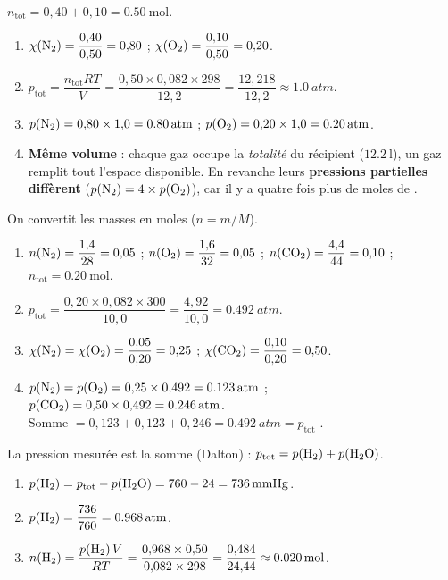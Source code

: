 \documentclass[11pt,a4paper]{article}
\begin{document}
\begin{corrige}
$n_{\text{tot}}=0{,}40+0{,}10=\qty{0.50}{\mole}$.
\begin{enumerate}[label=\alph*)]
  \item $\chi(\ce{N2})=\dfrac{0{,}40}{0{,}50}=0{,}80$ ; $\chi(\ce{O2})=\dfrac{0{,}10}{0{,}50}=0{,}20$.
  \item $p_{\text{tot}}=\dfrac{n_{\text{tot}}RT}{V}=\dfrac{0{,}50\times0{,}082\times298}{12{,}2}
        =\dfrac{12{,}218}{12{,}2}\approx\qty{1.0}{atm}$.
  \item $p(\ce{N2})=0{,}80\times1{,}0=\qty{0.80}{atm}$ ; $p(\ce{O2})=0{,}20\times1{,}0=\qty{0.20}{atm}$.
  \item \textbf{Même volume} : chaque gaz occupe la \emph{totalité} du récipient
        ($\qty{12.2}{\litre}$), un gaz remplit tout l'espace disponible. En revanche leurs
        \textbf{pressions partielles diffèrent} ($p(\ce{N2})=4\times p(\ce{O2})$), car il y a quatre
        fois plus de moles de .
\end{enumerate}
\end{corrige}

\begin{corrige}
On convertit les masses en moles ($n=m/M$).
\begin{enumerate}[label=\alph*)]
  \item $n(\ce{N2})=\dfrac{1{,}4}{28}=0{,}05$ ; $n(\ce{O2})=\dfrac{1{,}6}{32}=0{,}05$ ;
        $n(\ce{CO2})=\dfrac{4{,}4}{44}=0{,}10$ ; $n_{\text{tot}}=\qty{0.20}{\mole}$.
  \item $p_{\text{tot}}=\dfrac{0{,}20\times0{,}082\times300}{10{,}0}=\dfrac{4{,}92}{10{,}0}
        =\qty{0.492}{atm}$.
  \item $\chi(\ce{N2})=\chi(\ce{O2})=\dfrac{0{,}05}{0{,}20}=0{,}25$ ;
        $\chi(\ce{CO2})=\dfrac{0{,}10}{0{,}20}=0{,}50$.
  \item $p(\ce{N2})=p(\ce{O2})=0{,}25\times0{,}492=\qty{0.123}{atm}$ ;
        $p(\ce{CO2})=0{,}50\times0{,}492=\qty{0.246}{atm}$. \\
        Somme $=0{,}123+0{,}123+0{,}246=\qty{0.492}{atm}=p_{\text{tot}}$ \checkmark.
\end{enumerate}
\end{corrige}

\begin{corrige}
La pression mesurée est la somme (Dalton) : $p_{\text{tot}}=p(\ce{H2})+p(\ce{H2O})$.
\begin{enumerate}[label=\alph*)]
  \item $p(\ce{H2})=p_{\text{tot}}-p(\ce{H2O})=760-24=\qty{736}{mmHg}$.
  \item $p(\ce{H2})=\dfrac{736}{760}=\qty{0.968}{atm}$.
  \item $n(\ce{H2})=\dfrac{p(\ce{H2})\,V}{RT}=\dfrac{0{,}968\times0{,}50}{0{,}082\times298}
        =\dfrac{0{,}484}{24{,}44}\approx\qty{0.020}{\mole}$.
\end{enumerate}
\end{corrige}
\end{document}

